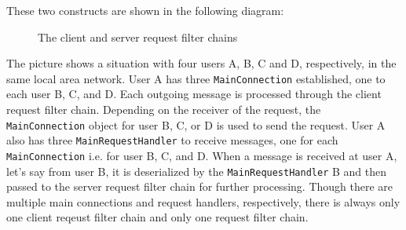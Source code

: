 These two constructs are shown in the following diagram:

\begin{figure}[H]
 \centering
 \caption{The client and server request filter chains}
 \label{fig:network.protocol.requestfilterchain}
\end{figure}

The picture shows a situation with four users A, B, C and D, respectively, in the same local area network. User A has three \texttt{MainConnection} established, one to each user B, C, and D.  Each outgoing message is processed through the client request filter chain. Depending on the receiver of the request, the \texttt{MainConnection} object for user B, C, or D is used to send the request. User A also has three \texttt{MainRequestHandler} to receive messages, one for each \texttt{MainConnection} i.e. for user B, C, and D. When a message is received at user A, let's say from user B, it is deserialized by the \texttt{MainRequestHandler} B and then passed to the server request filter chain for further processing. Though there are multiple main connections and request handlers, respectively, there is always only one client reqeust filter chain and only one request filter chain.

